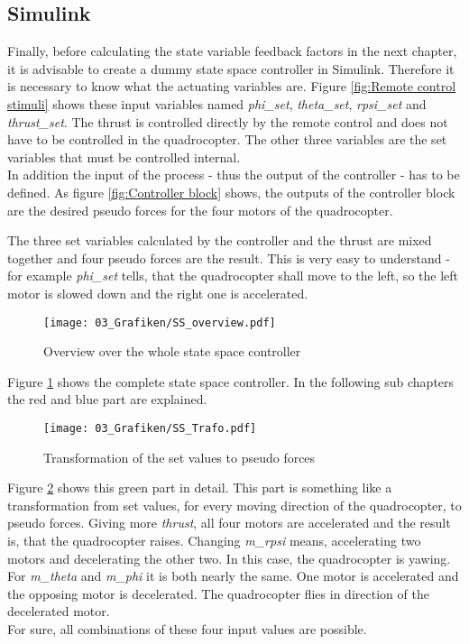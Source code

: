 \subsection{Simulink}\label{chapter_SimulinkIMPL}

Finally, before calculating the state variable feedback factors in the next chapter, it is advisable to create a dummy state space controller in Simulink. Therefore it is necessary to know what the actuating variables are. Figure \ref{fig:Remote control stimuli} shows these input variables named \textit{phi\_set}, \textit{theta\_set}, \textit{rpsi\_set} and \textit{thrust\_set}. The thrust is controlled directly by the remote control and does not have to be controlled in the quadrocopter. The other three variables are the set variables that must be controlled internal. \\
In addition the input of the process - thus the output of the controller - has to be defined. As figure \ref{fig:Controller block} shows, the outputs of the controller block are the desired pseudo forces for the four motors of the quadrocopter.

The three set variables calculated by the controller and the thrust are mixed together and four pseudo forces are the result. This is very easy to understand - for example \textit{phi\_set} tells, that the quadrocopter shall move to the left, so the left motor is slowed down and the right one is accelerated. 

\begin{figure}
	\centering
		\texttt{[image: 03\_Grafiken/SS\_overview.pdf]}
	\caption{Overview over the whole state space controller}
	\label{fig:SS_overview}
\end{figure}

Figure \ref{fig:SS_overview} shows the complete state space controller. In the following sub chapters the red and blue part are explained. 

\begin{figure}
	\centering
		\texttt{[image: 03\_Grafiken/SS\_Trafo.pdf]}
	\caption{Transformation of the set values to pseudo forces}
	\label{fig:SS_Trafo}
\end{figure}

Figure \ref{fig:SS_Trafo} shows this green part in detail. This part is something like a transformation from set values, for every moving direction of the quadrocopter, to pseudo forces. Giving more \textit{thrust}, all four motors are accelerated and the result is, that the quadrocopter raises. Changing \textit{m\_rpsi} means, accelerating two motors and decelerating the other two. In this case, the quadrocopter is yawing. For \textit{m\_theta} and \textit{m\_phi} it is both nearly the same. One motor is accelerated and the opposing motor is decelerated. The quadrocopter flies in direction of the decelerated motor. \\
For sure, all combinations of these four input values are possible. 